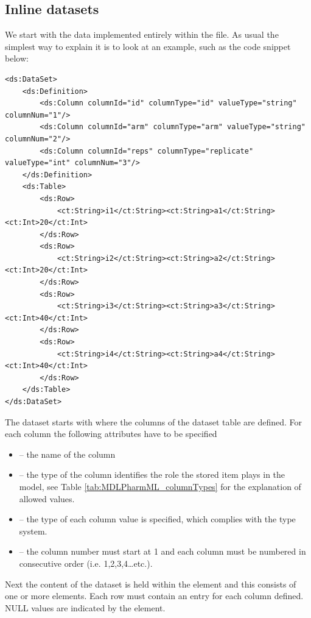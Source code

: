 \subsection{Inline datasets}
\label{subsec:inlineDataset}
We start with the data implemented entirely within the \pml file. As usual 
the simplest way to explain it is to look at an example, such as the code 
snippet below:
\lstset{language=XML}
\begin{lstlisting}
<ds:DataSet>
    <ds:Definition>
        <ds:Column columnId="id" columnType="id" valueType="string" columnNum="1"/>
        <ds:Column columnId="arm" columnType="arm" valueType="string" columnNum="2"/>
        <ds:Column columnId="reps" columnType="replicate" valueType="int" columnNum="3"/>
    </ds:Definition>
    <ds:Table>
        <ds:Row>
            <ct:String>i1</ct:String><ct:String>a1</ct:String><ct:Int>20</ct:Int>
        </ds:Row>
        <ds:Row>
            <ct:String>i2</ct:String><ct:String>a2</ct:String><ct:Int>20</ct:Int>
        </ds:Row>
        <ds:Row>
            <ct:String>i3</ct:String><ct:String>a3</ct:String><ct:Int>40</ct:Int>
        </ds:Row>
        <ds:Row>
            <ct:String>i4</ct:String><ct:String>a4</ct:String><ct:Int>40</ct:Int>
        </ds:Row>
    </ds:Table>
</ds:DataSet>
\end{lstlisting}
%
The dataset starts with  where the columns of the
dataset table are defined. For each column the following attributes have to be 
specified
\begin{itemize} 
\item
{} -- the name of the column  
\item
{} --  the type of the column identifies 
the role the stored item plays in the model, see Table \ref{tab:MDLPharmML_columnTypes}
for the explanation of allowed values.  

\item
{} -- the type of each column value is specified, which
complies with the \pharmml type system.  
\item
{} -- the column number must start at 1 and each
column must be numbered in consecutive order (i.e.\xspace 1,2,3,4\ldots etc.). 
\end{itemize}
Next the content of the dataset is held within the  element and 
this consists of one or more  elements. Each row must contain 
an entry for each column defined. NULL values are indicated by the 
element.

